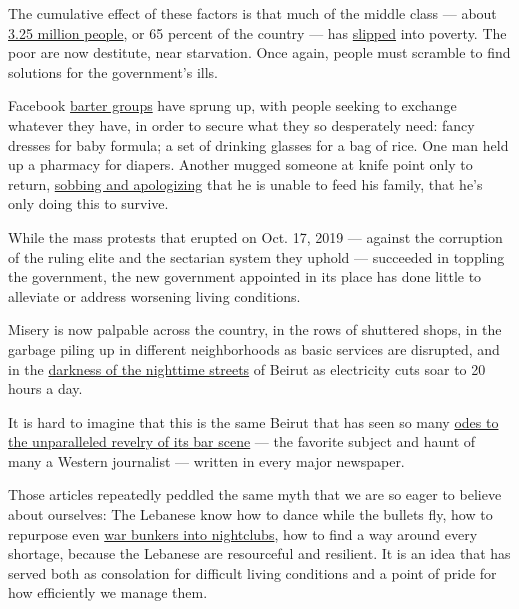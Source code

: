 The cumulative effect of these factors is that much of the middle class
--- about
\href{https://foreignpolicy.com/2020/05/21/lebanon-coronavirus-middle-class-poverty/}{3.25
million people}, or 65 percent of the country --- has
\href{https://carnegie-mec.org/diwan/82348}{slipped} into poverty. The
poor are now destitute, near starvation. Once again, people must
scramble to find solutions for the government's ills.

Facebook
\href{https://www.nytimes.com/2020/07/12/world/middleeast/beirut-lebanon-economic-crisis.html}{barter
groups} have sprung up, with people seeking to exchange whatever they
have, in order to secure what they so desperately need: fancy dresses
for baby formula; a set of drinking glasses for a bag of rice. One man
held up a pharmacy for diapers. Another mugged someone at knife point
only to return,
\href{https://www.france24.com/en/20200715-hunger-crimes-on-the-rise-in-crisis-hit-lebanon}{sobbing
and apologizing} that he is unable to feed his family, that he's only
doing this to survive.

While the mass protests that erupted on Oct. 17, 2019 --- against the
corruption of the ruling elite and the sectarian system they uphold ---
succeeded in toppling the government, the new government appointed in
its place has done little to alleviate or address worsening living
conditions.

Misery is now palpable across the country, in the rows of shuttered
shops, in the garbage piling up in different neighborhoods as basic
services are disrupted, and in the
\href{https://www.washingtonpost.com/world/middle_east/lebanons-rising-power-cuts-add-to-gloom-of-economic-crisis/2020/07/07/95498db4-c05f-11ea-8908-68a2b9eae9e0_story.html}{darkness
of the nighttime streets} of Beirut as electricity cuts soar to 20 hours
a day.

It is hard to imagine that this is the same Beirut that has seen so many
\href{https://www.telegraph.co.uk/news/worldnews/middleeast/lebanon/11748872/War-is-a-million-miles-away-when-the-Lebanese-begin-to-party.html}{odes
to the unparalleled revelry of its bar scene} --- the favorite subject
and haunt of many a Western journalist --- written in every major
newspaper.

Those articles repeatedly peddled the same myth that we are so eager to
believe about ourselves: The Lebanese know how to dance while the
bullets fly, how to repurpose even
\href{https://www.washingtonpost.com/lifestyle/travel/interior-designer-sarah-a-abdallah-brings-a-global-perspective-to-hotel-lobbies-and-restaurants/2018/02/09/8ef88344-f72a-11e7-a9e3-ab18ce41436a_story.html}{war
bunkers into nightclubs}, how to find a way around every shortage,
because the Lebanese are resourceful and resilient. It is an idea that
has served both as consolation for difficult living conditions and a
point of pride for how efficiently we manage them.

